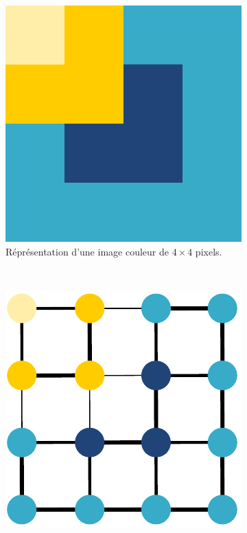 \begin{figure}[htb]
	\centering
	 \begin{subfigure}[t]{0.3\textwidth}	
			\includegraphics[width=\textwidth]{images/etat-de-l-art/grahIm}
		 \caption{Réprésentation d'une image couleur de $4 \times 4$ pixels.}
			\label{fig:sota:img_graph1}
	\end{subfigure}
	~
	 \begin{subfigure}[t]{0.3\textwidth}	
			\includegraphics[width=\textwidth]{images/etat-de-l-art/grahIm2}

\end{subfigure}
\end{figure}
